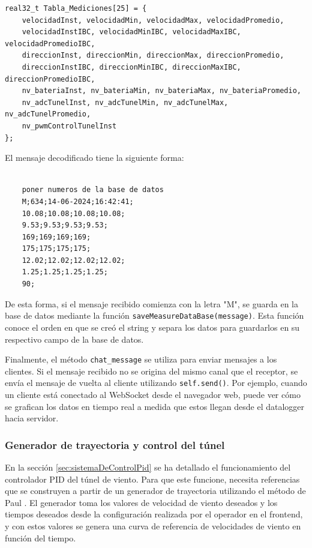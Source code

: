 \begin{lstlisting}[style=cstyle, caption={Estructura del mensaje enviado por el datalogger}, label=cdg:estructuraMensaje, basicstyle=\ttfamily\fontsize{8}{8}\selectfont]
real32_t Tabla_Mediciones[25] = {
    velocidadInst, velocidadMin, velocidadMax, velocidadPromedio,
    velocidadInstIBC, velocidadMinIBC, velocidadMaxIBC, velocidadPromedioIBC,
    direccionInst, direccionMin, direccionMax, direccionPromedio,
    direccionInstIBC, direccionMinIBC, direccionMaxIBC, direccionPromedioIBC,
    nv_bateriaInst, nv_bateriaMin, nv_bateriaMax, nv_bateriaPromedio,
    nv_adcTunelInst, nv_adcTunelMin, nv_adcTunelMax, nv_adcTunelPromedio,
    nv_pwmControlTunelInst
};
\end{lstlisting}

El mensaje decodificado tiene la siguiente forma:
\begin{verbatim}
    
    poner numeros de la base de datos
    M;634;14-06-2024;16:42:41;
    10.08;10.08;10.08;10.08;
    9.53;9.53;9.53;9.53;
    169;169;169;169;
    175;175;175;175;
    12.02;12.02;12.02;12.02;
    1.25;1.25;1.25;1.25;
    90;
\end{verbatim}

De esta forma, si el mensaje recibido comienza con la letra "M", se guarda en la base de datos mediante la función \texttt{saveMeasureDataBase(message)}. Esta función conoce el orden en que se creó el string y separa los datos para guardarlos en su respectivo campo de la base de datos.

Finalmente, el método \texttt{chat\_message} se utiliza para enviar mensajes a los clientes. Si el mensaje recibido no se origina del mismo canal que el receptor, se envía el mensaje de vuelta al cliente utilizando \texttt{self.send()}. Por ejemplo, cuando un cliente está conectado al WebSocket desde el navegador web, puede ver cómo se grafican los datos en tiempo real a medida que estos llegan desde el datalogger hacia servidor.


\subsubsection{Generador de trayectoria y control del túnel}\label{sec:genTrayec}

En la sección \ref{sec:sistemaDeControlPid} se ha detallado el funcionamiento del controlador PID del túnel de viento. Para que este funcione, necesita referencias que se construyen a partir de un generador de trayectoria utilizando el método de Paul \cite{RoboFIUBAGenTrayec}. El generador toma los valores de velocidad de viento deseados y los tiempos deseados desde la configuración realizada por el operador en el frontend, y con estos valores se genera una curva de referencia de velocidades de viento en función del tiempo.

